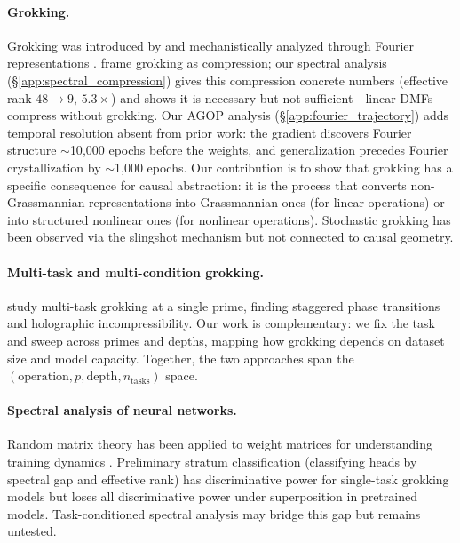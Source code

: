 \documentclass{article}
\begin{document}
\paragraph{Grokking.}
Grokking was introduced by \citet{power2022grokking} and mechanistically
analyzed through Fourier representations \citep{nanda2023progress,
zhong2024clock}. \citet{liu2023grokking} frame grokking as compression;
our spectral analysis (\S\ref{app:spectral_compression}) gives this
compression concrete numbers (effective rank $48 \to 9$, $5.3\times$) and
shows it is necessary but not sufficient---linear DMFs compress without
grokking. Our AGOP analysis (\S\ref{app:fourier_trajectory}) adds temporal
resolution absent from prior work: the gradient discovers Fourier structure
$\sim$10{,}000 epochs before the weights, and generalization precedes
Fourier crystallization by $\sim$1{,}000 epochs. Our contribution is to
show that grokking has a specific consequence for causal abstraction: it is
the process that converts non-Grassmannian representations into Grassmannian
ones (for linear operations) or into structured nonlinear ones (for nonlinear
operations). Stochastic grokking has been observed via the slingshot mechanism
\citep{thilak2022slingshot} but not connected to causal geometry.

\paragraph{Multi-task and multi-condition grokking.}
\citet{xu2026multitask} study multi-task grokking at a single prime, finding
staggered phase transitions and holographic incompressibility. Our work is
complementary: we fix the task and sweep across primes and depths, mapping how
grokking depends on dataset size and model capacity. Together, the two
approaches span the $(\text{operation}, p, \text{depth}, n_\text{tasks})$
space.

\paragraph{Spectral analysis of neural networks.}
Random matrix theory has been applied to weight matrices for understanding
training dynamics \citep{martin2021implicit}. Preliminary stratum
classification (classifying heads by spectral gap and effective rank) has
discriminative power for single-task grokking models but loses all
discriminative power under superposition in pretrained models.
Task-conditioned spectral analysis may bridge this gap but remains
untested.
\end{document}
